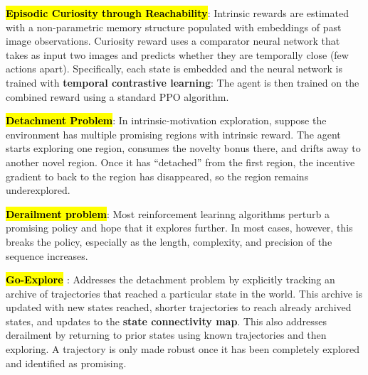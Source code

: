 \documentclass{article}
\begin{document}
  \textbf{\hl{Episodic Curiosity through Reachability}}: Intrinsic rewards are estimated with a non-parametric memory structure populated with embeddings of past image observations. Curiosity reward uses a comparator neural network that takes as input two images and predicts whether they are temporally close (few actions apart). Specifically, each state is embedded and the neural network is trained with \textbf{temporal contrastive learning}:
  The agent is then trained on the combined reward using a standard PPO algorithm.

  \textbf{\hl{Detachment Problem}}: In intrinsic-motivation exploration, suppose the environment has multiple promising regions with intrinsic reward. The agent starts exploring one region, consumes the novelty bonus there, and drifts away to another novel region. Once it has ``detached'' from the first region, the incentive gradient to back to the region has disappeared, so the region remains underexplored.

  \textbf{\hl{Derailment problem}}: Most reinforcement learinng algorithms perturb a promising policy and hope that it explores further. In most cases, however, this breaks the policy, especially as the length, complexity, and precision of the sequence increases.

  \textbf{\hl{Go-Explore} \cite{ecoffet2021first}}: Addresses the detachment problem by explicitly tracking an archive of trajectories that reached a particular state in the world. This archive is updated with new states reached, shorter trajectories to reach already archived states, and updates to the \textbf{state connectivity map}. This also addresses derailment by returning to prior states using known trajectories and then exploring. A trajectory is only made robust once it has been completely explored and identified as promising.
  
\end{document}
